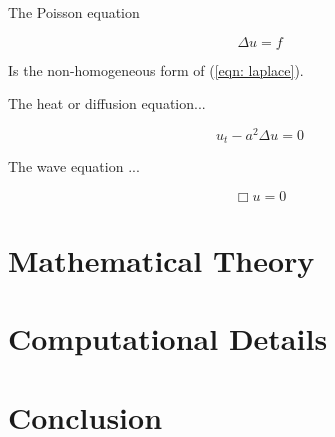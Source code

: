 \documentclass[10pt,a4paper]{article}
\begin{document}
The Poisson equation

\begin{equation}
\Delta u = f \label{eqn: poisson}
\end{equation}

Is the non-homogeneous form of (\ref{eqn: laplace}).

The heat or diffusion equation...

\begin{equation}
u_t - a^2 \Delta u = 0 \label{eqn: diffusion}
\end{equation}

The wave equation ...

\begin{equation}
\Box u = 0
\end{equation}

\section*{Mathematical Theory}

\section*{Computational Details}

\section*{Conclusion}
\end{document}
